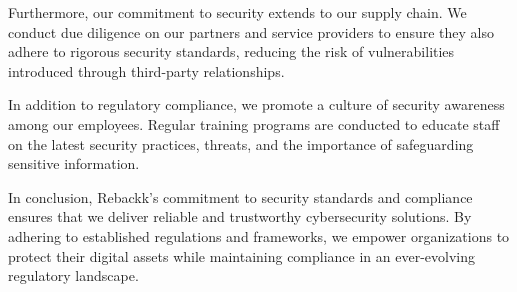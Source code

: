 Furthermore, our commitment to security extends to our supply chain. We conduct due diligence on our partners and service providers to ensure they also adhere to rigorous security standards, reducing the risk of vulnerabilities introduced through third-party relationships.

In addition to regulatory compliance, we promote a culture of security awareness among our employees. Regular training programs are conducted to educate staff on the latest security practices, threats, and the importance of safeguarding sensitive information.

In conclusion, Rebackk's commitment to security standards and compliance ensures that we deliver reliable and trustworthy cybersecurity solutions. By adhering to established regulations and frameworks, we empower organizations to protect their digital assets while maintaining compliance in an ever-evolving regulatory landscape.